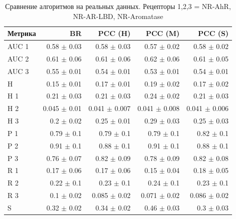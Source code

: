 \documentclass{ITaSconf}
\newcommand\headline{\hline}
\begin{document}
\begin{table}[p]%
	\caption{Сравнение алгоритмов на реальных данных. Рецепторы 1,2,3 = NR-AhR, NR-AR-LBD, NR-Aromatase}
	\label{t:realData}
	\centering\medskip%
	\begin{tabular}{lrrrr}
		\headline
		{Метрика} &             BR &           PCC (H) &          PCC (M) &           PCC (S) \\
		\headline
		AUC 1 &   0.58 $\pm$ 0.03 &    0.58 $\pm$ 0.03 &    0.57 $\pm$ 0.02 &    0.58 $\pm$ 0.02 \\
		AUC 2 &   0.61 $\pm$ 0.06 &    0.61 $\pm$ 0.06 &    0.62 $\pm$ 0.06 &    0.61 $\pm$ 0.05 \\
		AUC 3 &   0.55 $\pm$ 0.01 &    0.54 $\pm$ 0.01 &    0.53 $\pm$ 0.01 &    0.54 $\pm$ 0.01 \\
		H     &   0.15 $\pm$ 0.01 &    0.17 $\pm$ 0.01 &    0.19 $\pm$ 0.02 &    0.17 $\pm$ 0.02 \\
		H 1   &   0.21 $\pm$ 0.03 &    0.21 $\pm$ 0.03 &    0.24 $\pm$ 0.02 &    0.21 $\pm$ 0.03 \\
		H 2   &  0.045 $\pm$ 0.01 &  0.041 $\pm$ 0.007 &  0.041 $\pm$ 0.008 &  0.041 $\pm$ 0.006 \\
		H 3   &    0.2 $\pm$ 0.02 &    0.25 $\pm$ 0.01 &    0.29 $\pm$ 0.03 &    0.25 $\pm$ 0.03 \\
		P 1   &    0.79 $\pm$ 0.1 &     0.79 $\pm$ 0.1 &     0.79 $\pm$ 0.1 &     0.82 $\pm$ 0.1 \\
		P 2   &    0.91 $\pm$ 0.1 &     0.88 $\pm$ 0.1 &     0.91 $\pm$ 0.1 &     0.88 $\pm$ 0.1 \\
		P 3   &   0.76 $\pm$ 0.07 &    0.82 $\pm$ 0.09 &    0.78 $\pm$ 0.09 &    0.82 $\pm$ 0.08 \\
		R 1   &   0.17 $\pm$ 0.06 &    0.17 $\pm$ 0.06 &    0.15 $\pm$ 0.04 &    0.18 $\pm$ 0.05 \\
		R 2   &    0.22 $\pm$ 0.1 &     0.23 $\pm$ 0.1 &     0.24 $\pm$ 0.1 &     0.23 $\pm$ 0.1 \\
		R 3   &    0.1 $\pm$ 0.02 &   0.085 $\pm$ 0.02 &   0.071 $\pm$ 0.02 &   0.086 $\pm$ 0.02 \\
		S     &   0.32 $\pm$ 0.02 &    0.34 $\pm$ 0.02 &    0.46 $\pm$ 0.03 &     0.3 $\pm$ 0.03 \\
		\headline
	\end{tabular}
\end{table}


\clearpage

\end{document}
